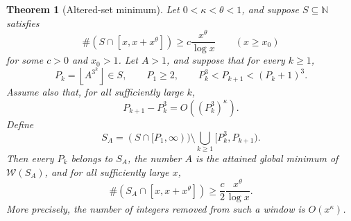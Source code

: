 \documentclass[11pt,a4paper]{article}
\newtheorem{theorem}{Theorem}[section]
\theoremstyle{definition}\newtheorem{definition}[theorem]{Definition}
\theoremstyle{remark}\newtheorem{remark}[theorem]{Remark}
\newcommand{\N}{\mathbb N}\newcommand{\Z}{\mathbb Z}\newcommand{\Q}{\mathbb Q}
\newcommand{\floor}[1]{\left\lfloor#1\right\rfloor}
\begin{document}
\begin{theorem}[Altered-set minimum]\label{R14:thm:thinning}
Let $0<\kappa<\theta<1$, and suppose $S\subseteq\N$ satisfies
\begin{equation}\label{R14:eq:richness}
 \#(S\cap[x,x+x^\theta])
 \ge c\frac{x^\theta}{\log x}\qquad(x\ge x_0)
\end{equation}
for some $c>0$ and $x_0>1$. Let $A>1$, and suppose that for every
$k\ge1$,
\begin{equation}\label{R14:eq:thinning-labels}
 P_k=\floor{A^{3^k}}\in S,\qquad P_1\ge2,\qquad
 P_k^3<P_{k+1}<(P_k+1)^3.
\end{equation}
Assume also that, for all sufficiently large $k$,
\begin{equation}\label{R14:eq:small-gap}
 P_{k+1}-P_k^3=O((P_k^3)^\kappa).
\end{equation}
Define
\begin{equation}\label{R14:eq:altered-set}
 S_A=(S\cap[P_1,\infty))
 \setminus\bigcup_{k\ge1}[P_k^3,P_{k+1}).
\end{equation}
Then every $P_k$ belongs to $S_A$, the number $A$ is the attained
global minimum of $\mathcal W(S_A)$, and for all sufficiently large
$x$,
\begin{equation}\label{R14:eq:retained-richness}
 \#(S_A\cap[x,x+x^\theta])
 \ge\frac c2\frac{x^\theta}{\log x}.
\end{equation}
More precisely, the number of integers removed from such a window
is $O(x^\kappa)$.
\end{theorem}
\end{document}
